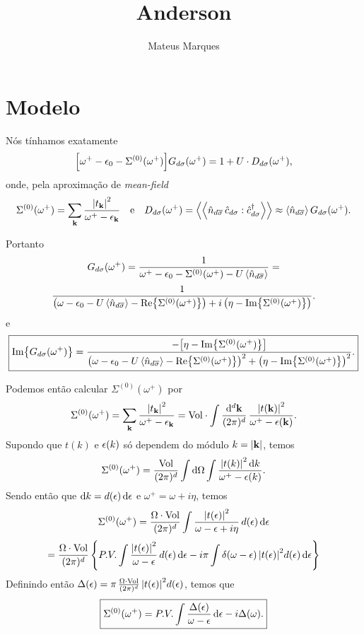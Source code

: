 \documentclass[a4paper,fleqn,12pt]{article}
\title{\Huge{\textbf{Anderson}}}
\author{Mateus Marques}
\begin{document}
\maketitle

\section{Modelo}

Nós tínhamos exatamente
$$
\qty[
\omega^+ - \epsilon_0 - \Sigma^{(0)}(\omega^+)
] G_{d\sigma}(\omega^+) = 1 + U \cdot
D_{d\sigma}(\omega^+),
$$
onde, pela aproximação de \textit{mean-field}
$$
\Sigma^{(0)}(\omega^+) = \sum_{\k} \frac{\abs{t_{\k}}^2}{\omega^+ - \eps_{\k}}
\e
D_{d\sigma}(\omega^+) = \gf{\nn_{d\cc{\sigma}} \, \c_{d\sigma}}{\c^\dagger_{d\sigma}}
\approx \ev{\nn_{d\cc{\sigma}}} G_{d\sigma}(\omega^+).
$$

Portanto
$$
G_{d\sigma}(\omega^+) =
\frac{1}{\omega^+ - \eps_0 - \Sigma^{(0)}(\omega^+) - U \ev{\nn_{d\cc{\sigma}}}} =
$$
$$
\frac{1}{
\qty(\omega - \eps_0 - U \ev{\nn_{d\cc{\sigma}}} - \Re{\Sigma^{(0)}(\omega^+)})
+ i \, \qty(\eta - \Im{\Sigma^{(0)}(\omega^+)})
}.
$$
e
$$
\boxed{ \Im{G_{d\sigma}(\omega^+)} =
\frac{- \qty[\eta - \Im{\Sigma^{(0)}(\omega^+)}]}{
\qty(\omega - \eps_0 - U \ev{\nn_{d\cc{\sigma}}} - \Re{\Sigma^{(0)}(\omega^+)})^2
+ \qty(\eta - \Im{\Sigma^{(0)}(\omega^+)})^2}. }
$$

\n

Podemos então calcular $\Sigma^{(0)}(\omega^+)$ por
$$
\Sigma^{(0)}(\omega^+) = \sum_{\vb{k}} \frac{\abs{t_{\vb{k}}}^2}{\omega^+ - \epsilon_{\vb{k}}} =
\text{Vol} \cdot \int \frac{\dd[d]{{\vb{k}}}}{(2\pi)^d} \, \frac{\abs{t({\vb{k}})}^2}{\omega^+ - \epsilon({\vb{k}})}.
$$
Supondo que $t(k)$ e $\epsilon(k)$ só dependem do módulo $k = \abs{\vb{k}}$, temos
$$
\Sigma^{(0)}(\omega^+) = \frac{\text{Vol}}{(2\pi)^d}
\int \dd{\Omega}
\int \frac{\abs{t(k)}^2 \dd{k}}{\omega^+ - \epsilon(k)}.
$$
Sendo então que $\dd{k} = d(\epsilon) \dd{\epsilon}$ e $\omega^+ = \omega + i\eta$, temos
$$
\Sigma^{(0)}(\omega^+) = \frac{\Omega \cdot \text{Vol}}{(2\pi)^d}
\int \frac{\abs{t(\epsilon)}^2}{\omega - \epsilon + i \eta} \, d(\epsilon) \dd{\epsilon}
$$
$$
= \frac{\Omega \cdot \text{Vol}}{(2\pi)^d} \, \qty{
P.V. \int \frac{\abs{t(\epsilon)}^2}{\omega - \epsilon} \, d(\epsilon) \dd{\epsilon}
- i \pi \int \delta(\omega - \epsilon) \, \abs{t(\epsilon)}^2  d(\epsilon) \dd{\epsilon}
}
$$
Definindo então $\Delta(\epsilon) = \pi \, \frac{\Omega \cdot \text{Vol}}{(2\pi)^d} \, \abs{t(\epsilon)}^2  d(\epsilon)$, temos que
$$
\boxed{ \Sigma^{(0)}(\omega^+) = P.V. \int \frac{\Delta(\epsilon)}{\omega - \epsilon} \dd{\epsilon} - i \Delta(\omega). }
$$
\end{document}
